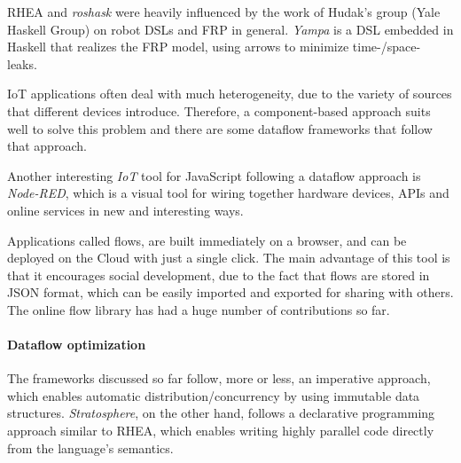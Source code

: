 \documentclass[sigplan,review,anonymous]{acmart}
\begin{document}
\textsc{RHEA} and \textit{roshask} were heavily influenced by the work of Hudak's
group (Yale Haskell Group) on robot DSLs and FRP in general\cite{fran,arrows_robots,lambda_in_motion}.
\textit{Yampa} is a DSL embedded in Haskell
that realizes the FRP model, using arrows to minimize time-/space- leaks.


IoT applications often deal with much heterogeneity, due to the variety of
sources that different devices introduce. Therefore, a component-based approach
suits well to solve this problem and there are some dataflow frameworks that
follow that approach.

Another interesting \textit{IoT} tool for JavaScript following a dataflow
approach is \textit{Node-RED}\cite{node-red}, which is a visual tool for wiring
together hardware devices, APIs and online services in new and interesting ways.

Applications called flows, are built immediately on a browser, and can be
deployed on the Cloud with just a single click. The main advantage of this tool
is that it encourages social development, due to the fact that flows are stored
in JSON format, which can be easily imported and exported for sharing with
others. The online flow library has had a huge
number of contributions so far.

\paragraph{Dataflow optimization}

The frameworks discussed so far follow, more or less, an imperative approach,
which enables automatic distribution/concurrency by using immutable data
structures. \textit{Stratosphere}\cite{stratosphere}, on the other hand, follows
a declarative programming approach similar to \textsc{RHEA}, which enables
writing highly parallel code directly from the language's semantics.
\end{document}

